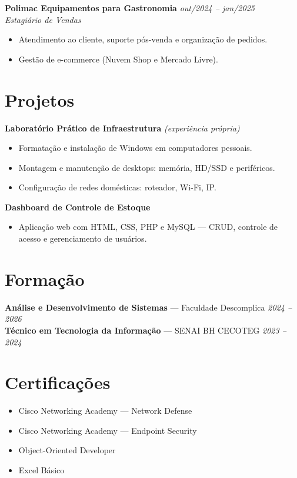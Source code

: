 \documentclass[11pt,a4paper]{article}
\begin{document}
\medskip

\textbf{Polimac Equipamentos para Gastronomia} \hfill \textit{out/2024 -- jan/2025}\\
\textit{Estagiário de Vendas}
\begin{itemize}
  \item Atendimento ao cliente, suporte pós-venda e organização de pedidos.
  \item Gestão de e-commerce (Nuvem Shop e Mercado Livre).
\end{itemize}

\section{Projetos}

\textbf{Laboratório Prático de Infraestrutura} \textit{(experiência própria)}
\begin{itemize}
  \item Formatação e instalação de Windows em computadores pessoais.
  \item Montagem e manutenção de desktops: memória, HD/SSD e periféricos.
  \item Configuração de redes domésticas: roteador, Wi-Fi, IP.
\end{itemize}

\medskip

\textbf{Dashboard de Controle de Estoque}
\begin{itemize}
  \item Aplicação web com HTML, CSS, PHP e MySQL --- CRUD, controle de acesso e
        gerenciamento de usuários.
\end{itemize}

\section{Formação}

\textbf{Análise e Desenvolvimento de Sistemas} --- Faculdade Descomplica \hfill \textit{2024 -- 2026}\\
\textbf{Técnico em Tecnologia da Informação} --- SENAI BH CECOTEG \hfill \textit{2023 -- 2024}

\section{Certificações}
\begin{itemize}
  \item Cisco Networking Academy --- Network Defense
  \item Cisco Networking Academy --- Endpoint Security
  \item Object-Oriented Developer
  \item Excel Básico
\end{itemize}
\end{document}
